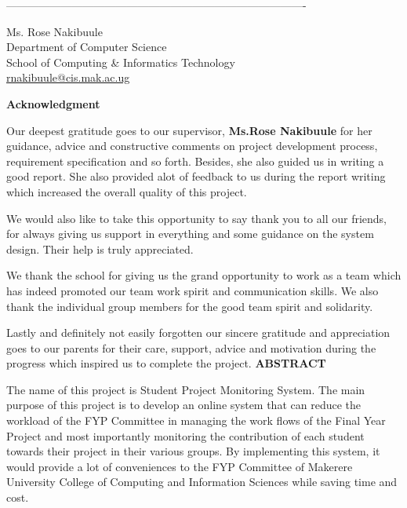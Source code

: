 \documentclass{article}
\begin{document}
----------------------------------------------------------------------------------\\
\begin{flushleft}
Ms. Rose Nakibuule\\
\vspace{0.5em}
Department of Computer Science\\
\vspace{0.5em}
School of Computing \& Informatics Technology \\
\vspace{0.5em}
\url{rnakibuule@cis.mak.ac.ug}
\end{flushleft}
\newpage
\textbf{Acknowledgment}\\
\par Our deepest gratitude goes to our supervisor, \textbf{Ms.Rose Nakibuule} for her guidance, advice and
constructive comments on project development process, requirement specification and so forth. Besides, she also guided us  in writing a good report. She also provided alot of feedback to us during the report writing which increased the overall quality of this project.
\vspace*{8mm}
\par We would also like to take this opportunity to say thank you to all our friends, for always giving us support in everything and some guidance on the system design. Their help is  truly appreciated.
\vspace*{8mm}
\par We thank the school for giving us the grand opportunity to work as a team which has indeed promoted our team work spirit and communication skills. We also thank the individual group members for the good team spirit and solidarity.
\vspace*{8mm}
\par Lastly and definitely not easily forgotten our sincere gratitude and appreciation goes to our parents for their care, support, advice and motivation during the progress which inspired us to complete the project.
\newpage
\textbf{ABSTRACT}\\
\par The name of this project is Student Project Monitoring System. The main purpose of this project is to develop an online system that can reduce the workload of the FYP Committee in managing the work flows of the Final Year Project and most importantly monitoring the contribution of each student towards their project in their various groups.  By implementing this system, it would provide a lot of conveniences to the FYP Committee of Makerere University College of Computing and Information Sciences while saving time and cost.
\end{document}

